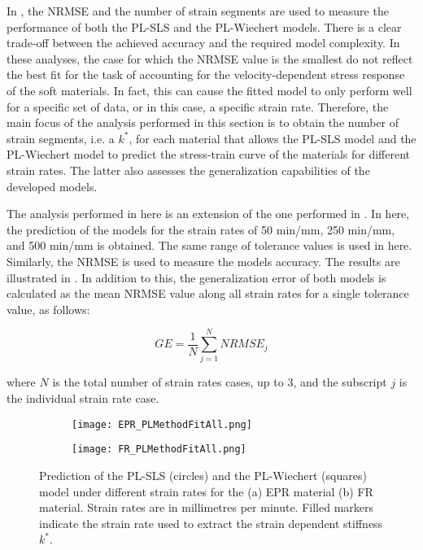 In , the NRMSE and the number of strain segments are used to measure the performance of both the PL-SLS and the PL-Wiechert models. There is a clear trade-off between the achieved accuracy and the required model complexity. In these analyses, the case for which the NRMSE value is the smallest do not reflect the best fit for the task of accounting for the velocity-dependent stress response of the soft materials. In fact, this can cause the fitted model to only perform well for a specific set of data, or in this case, a specific strain rate. Therefore, the main focus of the analysis performed in this section is to obtain the number of strain segments, i.e. a $k^*$, for each material that allows the PL-SLS model and the PL-Wiechert model to predict the stress-train curve of the materials for different strain rates. The latter also assesses the generalization capabilities of the developed models.

The analysis performed in here is an extension of the one performed in . In here, the prediction of the models for the strain rates of 50 min/mm, 250 min/mm, and 500 min/mm is obtained. The same range of tolerance values is used in here. Similarly, the NRMSE is used to measure the models accuracy. The results are illustrated in . In addition to this, the generalization error of both models is calculated as the mean NRMSE value along all strain rates for a single tolerance value, as follows:


\begin{equation}
	\label{eqGE}
	GE = \frac{1}{N}\sum_{j=1}^{N} NRMSE_j
\end{equation}

\noindent where $N$ is the total number of strain rates cases, up to 3, and the subscript $j$ is the individual strain rate case.


\begin{figure}[H]
	\vspace*{-2em}
	\centering
	\begin{subfigure}[b]{0.9\textwidth}
		\centering
		\texttt{[image: EPR\_PLMethodFitAll.png]}
		\caption{}
		\label{fig:FitAllEPR}
	\end{subfigure}
	\begin{subfigure}[b]{0.9\textwidth}
		\centering
		\texttt{[image: FR\_PLMethodFitAll.png]}
		\caption{}
		\label{fig:FitAllFR}
	\end{subfigure}
	\caption{Prediction of the PL-SLS (circles) and the PL-Wiechert (squares) model under different strain rates for the (a) EPR material (b) FR material. Strain rates are in millimetres per minute. Filled markers indicate the strain rate used to extract the strain dependent stiffness $k^*$. }
	\label{fig:FitAllEPR_FR}
\end{figure}


